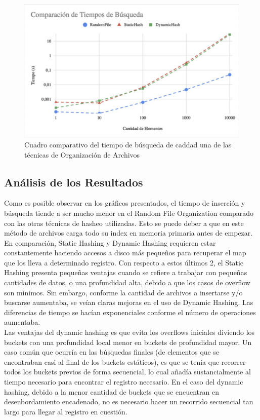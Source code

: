 \documentclass{article}
\begin{document}
      \begin{figure}[h]

        \includegraphics[width = \textwidth]{tiempoBusqueda}
        \caption{Cuadro comparativo del tiempo de búsqueda de caddad una de las técnicas de Organización de Archivos}

      \end{figure}

    \subsection{Análisis de los Resultados}

      Como es posible observar en los gráficos presentados, el tiempo de inserción y búsqueda tiende a ser mucho menor en el Random File Organization comparado con las otras técnicas de hasheo utilizadas. Esto se puede deber a que en este método de archivos carga todo su index en memoria primaria antes de empezar. En comparación, Static Hashing y Dynamic Hashing requieren estar constantemente haciendo accesos a disco más pequeños para recuperar el map que los lleva a determinado registro. Con respecto a estos últimos 2, el Static Hashing presenta pequeñas ventajas cuando se refiere a trabajar con pequeñas cantidades de datos, o una profundidad alta, debido a que los casos de overflow son mínimos. Sin embargo, conforme la cantidad de archivos a insertarse y/o buscarse aumentaba, se veían claras mejoras en el uso de Dynamic Hashing. Las diferencias de tiempo se hacían exponenciales conforme el número de operaciones aumentaba. \\

      Las ventajas del dynamic hashing es que evita los overflows iniciales diviendo los buckets con una profundidad local menor en buckets de profundidad mayor. Un caso común que ocurría en las búsquedas finales  (de elementos que se encontraban casi al final de los buckets estáticos), es que se tenía que recorrer todos los buckets previos de forma secuencial, lo cual añadía sustancialmente al tiempo necesario para encontrar el registro necesario. En el caso del dynamic hashing, debido a la menor cantidad de buckets que se encuentran en desenbordamiento encadenado, no es necesario hacer un recorrido secuencial tan largo para llegar al registro en cuestión.
\end{document}
